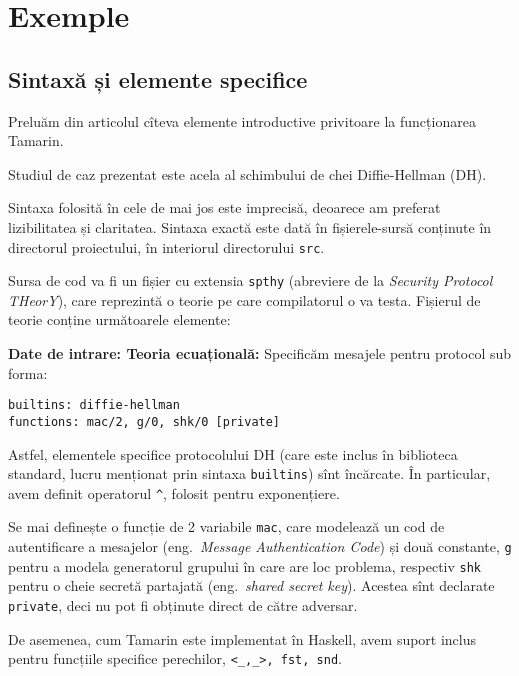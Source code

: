 
\chapter{Exemple}

\section{Sintaxă și elemente specifice}

Preluăm din articolul \cite{DBLP:journals/siglog/BasinCDS17} cîteva
elemente introductive privitoare la funcționarea Tamarin.

Studiul de caz prezentat este acela al schimbului de chei Diffie-Hellman (DH).

\begin{remark}\label{rk:sintaxa}
  Sintaxa folosită în cele de mai jos este imprecisă, deoarece am
  preferat lizibilitatea și claritatea. Sintaxa exactă este dată în
  fișierele-sursă conținute în directorul proiectului, în interiorul
  directorului \texttt{src}.
\end{remark}

Sursa de cod va fi un fișier cu extensia \texttt{spthy} (abreviere de la
\emph{Security Protocol THeorY}), care reprezintă
o teorie pe care compilatorul o va testa. Fișierul de teorie conține
următoarele elemente:

\textbf{Date de intrare: Teoria ecuațională:} Specificăm mesajele pentru
protocol sub forma:

\begin{verbatim}
builtins: diffie-hellman
functions: mac/2, g/0, shk/0 [private]
\end{verbatim}

Astfel, elementele specifice protocolului DH (care este inclus în biblioteca
standard, lucru menționat prin sintaxa \texttt{builtins}) sînt încărcate.
În particular, avem definit operatorul \texttt{\^}, folosit pentru exponențiere.

Se mai definește o funcție de 2 variabile \texttt{mac}, care modelează un
cod de autentificare a mesajelor (eng.\ \emph{Message Authentication Code})
și două constante, \texttt{g} pentru a modela generatorul grupului în care
are loc problema, respectiv \texttt{shk} pentru o cheie secretă partajată
(eng.\ \emph{shared secret key}). Acestea sînt declarate \texttt{private},
deci nu pot fi obținute direct de către adversar.

De asemenea, cum Tamarin este implementat în Haskell, avem suport inclus
pentru func\-ți\-i\-le specifice perechilor, \texttt{<\_,\_>, fst, snd}.

